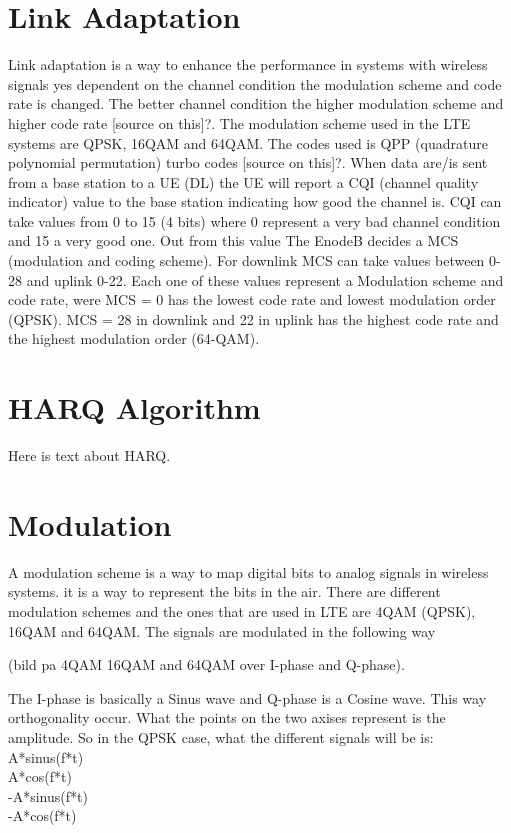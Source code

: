 \documentclass[cropmarks, frame, english]{idamasterthesis}
\begin{document}
\section{Link Adaptation}
Link adaptation is a way to enhance the performance in systems with wireless signals yes dependent on the channel condition the modulation scheme and code rate is changed. The better channel condition the higher modulation scheme and higher code rate [source on this]?. The modulation scheme used in the LTE systems are QPSK, 16QAM and 64QAM. The codes used is QPP (quadrature polynomial permutation) turbo codes [source on this]?. When data are/is sent from a base station to a UE (DL) the UE will report a CQI (channel quality indicator) value to the base station indicating how good the channel is. CQI can take values from 0 to 15 (4 bits) where 0 represent a very bad channel condition and 15 a very good one. Out from this value The EnodeB decides a MCS (modulation and coding scheme). For downlink MCS can take values between 0-28 and uplink 0-22. Each one of these values represent a Modulation scheme and code rate, were MCS = 0 has the lowest code rate and lowest modulation order (QPSK). MCS = 28 in downlink and 22 in uplink has the highest code rate and the highest modulation order (64-QAM).

\section{HARQ Algorithm}
Here is text about HARQ.

\section{Modulation}
A modulation scheme is a way to map digital bits to analog signals in wireless systems. it is a way to represent the bits in the air.
There are different modulation schemes and the ones that are used in LTE are 4QAM (QPSK), 16QAM and 64QAM. The signals are modulated in the following way 

(bild pa 4QAM 16QAM and 64QAM over I-phase and Q-phase). 
 
The I-phase is basically a Sinus wave and Q-phase is a Cosine wave. This way orthogonality occur. What the points on the two axises represent is the amplitude. So in the QPSK case, what the different signals will be is:\\
 A*sinus(f*t)\\
 A*cos(f*t)\\
 -A*sinus(f*t) \\  
 -A*cos(f*t)\\
 
\end{document}
